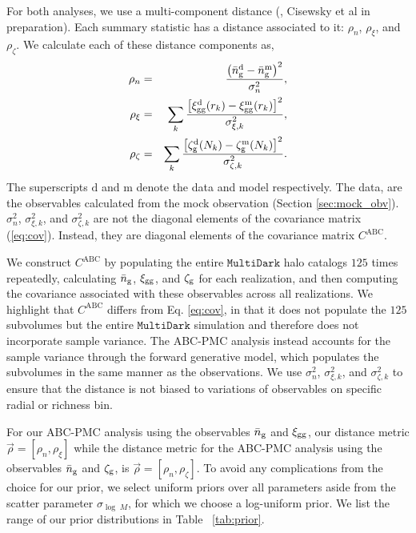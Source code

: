 \documentclass[fleqn,usenatbib]{mnras}
\begin{document}
For both analyses, we use a multi-component distance (\citealt{silk12}, Cisewsky et al in preparation). 
Each summary statistic has a distance associated to it: $\rho_{n}$, $\rho_{\xi}$, and $\rho_{\zeta}$. 
We calculate each of these distance components as,   
\begin{eqnarray}
\rho_{n} &=& \frac{\left(\bar{n}_{\mathrm{g}}^\mathrm{d} - \bar{n}_{\mathrm{g}}^\mathrm{m} \right)^{2}}{\sigma^{2}_{n}}, \label{dn}\\
\rho_{\xi} &=& \sum_{k} \frac{\left[\xi_{\mathrm{gg}}^\mathrm{d}(r_k) - \xi_{\mathrm{gg}}^\mathrm{m}(r_k) \right]^{2}}{\sigma_{\xi,k}^{2}}, \label{dxi} \\
\rho_{\zeta} &=& \sum_{k} \frac{\left[\mathcal{\zeta}_{\rm g}^\mathrm{d}(N_k) - \mathcal{\zeta}_{\rm g}^\mathrm{m}(N_k) \right]^{2}}{\sigma_{\zeta,k}^{2}}. \label{dgmf}
\end{eqnarray}
The superscripts $\mathrm{d}$ and $\mathrm{m}$ denote the data and model respectively. The data, 
are the observables calculated from the mock observation (Section \ref{sec:mock_obv}). 
$\sigma_{n}^{2}$, $\sigma_{\xi,k}^{2}$, and $\sigma_{\zeta,k}^{2}$ are not the diagonal elements 
of the covariance matrix (\ref{eq:cov}). Instead, they are diagonal elements of the covariance matrix 
$C^\mathrm{ABC}$. 

We construct $C^\mathrm{ABC}$ by populating the entire $\mathtt{MultiDark}$ halo catalogs $125$ times 
repeatedly, calculating $\bar{n}_{\mathrm{g}}$, $\xi_{\mathrm{gg}}$, and $\mathcal{\zeta}_{\rm g}$ for each realization, and then computing 
the covariance associated with these observables across all realizations. We highlight that $C^\mathrm{ABC}$ 
differs from Eq. \ref{eq:cov}, in that it does not populate the $125$ subvolumes but the entire 
$\mathtt{MultiDark}$ simulation and therefore does not incorporate sample variance. The ABC-PMC analysis 
instead accounts for the sample variance through the forward generative model, which populates the subvolumes
in the same manner as the observations. We use $\sigma_{n}^{2}$, $\sigma_{\xi,k}^{2}$, and $\sigma_{\zeta,k}^{2}$ 
to ensure that the distance is not biased to variations of observables on specific radial or richness bin. 

For our ABC-PMC analysis using the observables $\bar{n}_{\mathrm{g}}$ and $\xi_{\mathrm{gg}}$, our distance metric 
$\vec\rho = [\rho_n, \rho_\xi]$ while the distance metric for the ABC-PMC analysis using 
the observables $\bar{n}_{\mathrm{g}}$ and $\mathcal{\zeta}_{\rm g}$, is $\vec\rho = [\rho_n, \rho_\zeta]$.
To avoid any complications from the choice for our prior, we select uniform priors over all parameters aside from the scatter parameter $\sigma_{\log\;M}$, for which we choose a log-uniform prior. 
We list the range of our prior distributions in Table ~\ref{tab:prior}.
\end{document}
